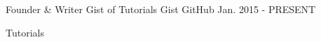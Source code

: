 

\begin{cventries}

  \cventry
    {Founder \& Writer} %
    {Gist of Tutorials} %
    {Gist GitHub} %
    {Jan. 2015 - PRESENT} %
    {
      \begin{cvitems} %
        \item {Tutorials}
      \end{cvitems}
    }

\end{cventries}
